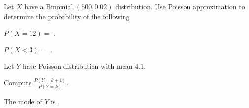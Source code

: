 \documentclass{ximera}
\begin{document}
Let $X$ have a Binomial $(500,0.02)$ distribution. Use Poisson approximation to determine the probability of the following

\begin{question} 
     \begin{solution}
          $P(X=12) = $  .
     \end{solution}
\end{question}

\begin{question} 
     \begin{solution}
          $P(X<3) = $  .
     \end{solution}
\end{question}

Let $Y$ have Poisson distribution with mean $4.1$. 

\begin{question}
     \begin{hint}
          Compute $\frac{P(Y=k+1)}{P(Y=k)}$.
     \end{hint} 
     \begin{solution}
          The mode of $Y$ is  .
     \end{solution}
\end{question}
\end{document}
